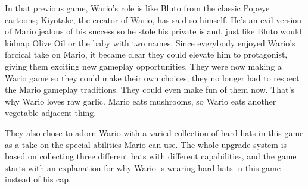 \documentclass{book}
\let\oldcenter\center
\let\oldendcenter\endcenter
\renewenvironment{center}{\setlength\topsep{0pt}\oldcenter}{\oldendcenter}
\begin{document}
In that previous game, Wario’s role is like Bluto from the classic Popeye cartoons; Kiyotake, the creator of Wario, has said so himself. He’s an evil version of Mario jealous of his success so he stole his private island, just like Bluto would kidnap Olive Oil or the baby with two names. Since everybody enjoyed Wario’s farcical take on Mario, it became clear they could elevate him to protagonist, giving them exciting new gameplay opportunities. They were now making a Wario game so they could make their own choices; they no longer had to respect the Mario gameplay traditions. They could even make fun of them now. That’s why Wario loves raw garlic. Mario eats mushrooms, so Wario eats another vegetable-adjacent thing.

They also chose to adorn Wario with a varied collection of hard hats in this game as a take on the special abilities Mario can use. The whole upgrade system is based on collecting three different hats with different capabilities, and the game starts with an explanation for why Wario is wearing hard hats in this game instead of his cap.

\begin{center}
\quad\vspace{4pt}
\quad\vspace{4pt}
\quad\vspace{4pt}
\quad\vspace{4pt}
\end{center}
\end{document}
